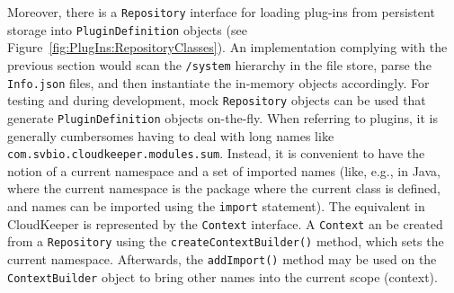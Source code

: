Moreover, there is a \texttt{Repository} interface for loading plug-ins from persistent storage into \texttt{PluginDefinition} objects (see Figure~\ref{fig:PlugIns:RepositoryClasses}). An implementation complying with the previous section would scan the \texttt{/system} hierarchy in the file store, parse the \texttt{Info.json} files, and then instantiate the in-memory objects accordingly. For testing and during development, mock \texttt{Repository} objects can be used that generate \texttt{PluginDefinition} objects on-the-fly. When referring to plugins, it is generally cumbersomes having to deal with long names like \texttt{com.svbio.cloudkeeper.modules.sum}. Instead, it is convenient to have the notion of a current namespace and a set of imported names (like, e.g., in Java, where the current namespace is the package where the current class is defined, and names can be imported using the \texttt{import} statement). The equivalent in CloudKeeper is represented by the \texttt{Context} interface. A \texttt{Context} an be created from a \texttt{Repository} using the \texttt{createContextBuilder()} method, which sets the current namespace. Afterwards, the \texttt{addImport()} method may be used on the \texttt{ContextBuilder} object to bring other names into the current scope (context).

